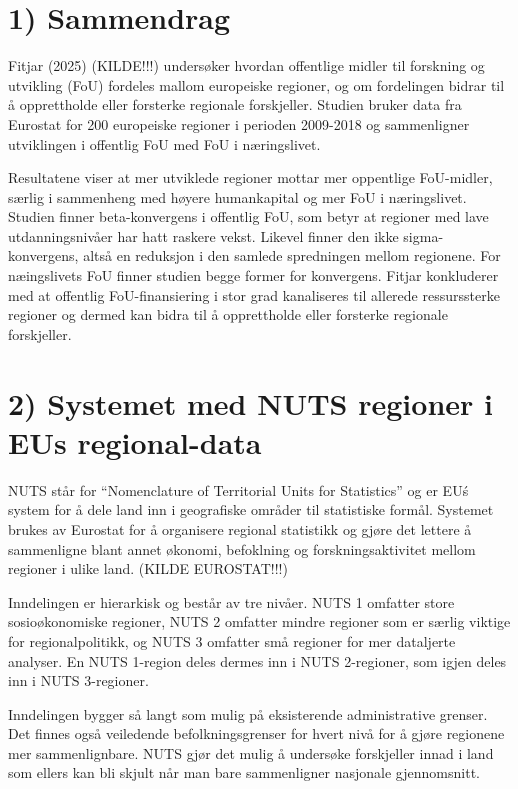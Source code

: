 \documentclass[
  letterpaper,
  DIV=11,
  numbers=noendperiod]{scrartcl}
\begin{document}
\section{1) Sammendrag}\label{sammendrag}

Fitjar (2025) (KILDE!!!) undersøker hvordan offentlige midler til
forskning og utvikling (FoU) fordeles mallom europeiske regioner, og om
fordelingen bidrar til å opprettholde eller forsterke regionale
forskjeller. Studien bruker data fra Eurostat for 200 europeiske
regioner i perioden 2009-2018 og sammenligner utviklingen i offentlig
FoU med FoU i næringslivet.

Resultatene viser at mer utviklede regioner mottar mer oppentlige
FoU-midler, særlig i sammenheng med høyere humankapital og mer FoU i
næringslivet. Studien finner beta-konvergens i offentlig FoU, som betyr
at regioner med lave utdanningsnivåer har hatt raskere vekst. Likevel
finner den ikke sigma-konvergens, altså en reduksjon i den samlede
spredningen mellom regionene. For næingslivets FoU finner studien begge
former for konvergens. Fitjar konkluderer med at offentlig
FoU-finansiering i stor grad kanaliseres til allerede ressurssterke
regioner og dermed kan bidra til å opprettholde eller forsterke
regionale forskjeller.

\section{2) Systemet med NUTS regioner i EUs
regional-data}\label{systemet-med-nuts-regioner-i-eus-regional-data}

NUTS står for ``Nomenclature of Territorial Units for Statistics'' og er
EUś system for å dele land inn i geografiske områder til statistiske
formål. Systemet brukes av Eurostat for å organisere regional statistikk
og gjøre det lettere å sammenligne blant annet økonomi, befoklning og
forskningsaktivitet mellom regioner i ulike land. (KILDE EUROSTAT!!!)

Inndelingen er hierarkisk og består av tre nivåer. NUTS 1 omfatter store
sosioøkonomiske regioner, NUTS 2 omfatter mindre regioner som er særlig
viktige for regionalpolitikk, og NUTS 3 omfatter små regioner for mer
dataljerte analyser. En NUTS 1-region deles dermes inn i NUTS
2-regioner, som igjen deles inn i NUTS 3-regioner.

Inndelingen bygger så langt som mulig på eksisterende administrative
grenser. Det finnes også veiledende befolkningsgrenser for hvert nivå
for å gjøre regionene mer sammenlignbare. NUTS gjør det mulig å
undersøke forskjeller innad i land som ellers kan bli skjult når man
bare sammenligner nasjonale gjennomsnitt.
\end{document}

